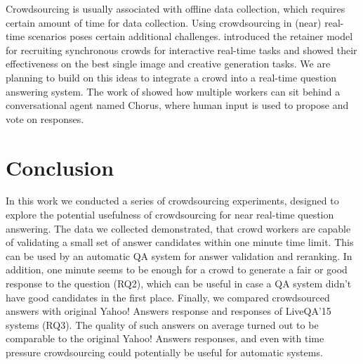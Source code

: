 \documentclass[11pt,letterpaper]{article}
\begin{document}
Crowdsourcing is usually associated with offline data collection, which requires certain amount of time for data collection.
Using crowdsourcing in (near) real-time scenarios poses certain additional challenges.
\cite{bernstein2011crowds} introduced the retainer model for recruiting synchronous crowds for interactive real-time tasks and showed their effectiveness on the best single image and creative generation tasks.
We are planning to build on this ideas to integrate a crowd into a real-time question answering system.
The work of \cite{Lasecki:2013:CCC:2501988.2502057} showed how multiple workers can sit behind a conversational agent named Chorus, where human input is used to propose and vote on responses. 


\section{Conclusion}
\label{sec:conclusion}

In this work we conducted a series of crowdsourcing experiments, designed to explore the potential usefulness of crowdsourcing for near real-time question answering.
The data we collected demonstrated, that crowd workers are capable of validating a small set of answer candidates within one minute time limit.
This can be used by an automatic QA system for answer validation and reranking.
In addition, one minute seems to be enough for a crowd to generate a fair or good response to the question (RQ2), which can be useful in case a QA system didn't have good candidates in the first place.
Finally, we compared crowdsourced answers with original Yahoo! Answers response and responses of LiveQA'15 systems (RQ3).
The quality of such answers on average turned out to be comparable to the original Yahoo! Answers responses, and even with time pressure crowdsourcing could potentially be useful for automatic systems.




\end{document}
